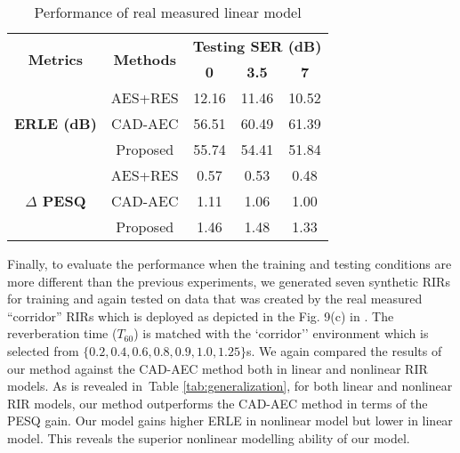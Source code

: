 \documentclass{article}
\begin{document}
\begin{sloppy}
\begin{table}[htb]
\setlength{\abovecaptionskip}{0.2cm}
\setlength{\belowcaptionskip}{0.2cm}
\centering
\caption{Performance of real measured linear model}
\label{tab:reallinear}
\begin{tabular}{|c|c|c|c|c|}
\hline
\multirow{2}{*}{\textbf{Metrics}}   & \multirow{2}{*}{\textbf{Methods}} & \multicolumn{3}{c|}{\textbf{Testing SER (dB)}} \\ \cline{3-5}
                      &       & \textbf{0}     & \textbf{3.5}    & \textbf{7}           \\ \hline \hline
\multirow{3}{*}{\textbf{ERLE (dB)}} & AES+RES    & 12.16    & 11.46    & 10.52       \\ \cline{2-5}
                      & CAD-AEC     & 56.51   & 60.49   & 61.39  \\ \cline{2-5}
                      & Proposed    & 55.74   & 54.41   & 51.84  \\ \hline
\multirow{3}{*}{\textbf{$\Delta$ PESQ}} & AES+RES   & 0.57   & 0.53    & 0.48       \\ \cline{2-5}
                      & CAD-AEC       & 1.11   & 1.06    & 1.00  \\ \cline{2-5}
                      & Proposed      & 1.46  & 1.48   &  1.33     \\ \hline
\end{tabular}
\end{table}
Finally, to evaluate the performance when the training and testing conditions are more different than the previous experiments, we generated seven synthetic RIRs for training and again tested on data that was created by the real measured ``corridor'' RIRs which is deployed as depicted in the Fig. 9(c) in \cite{realRIR}. The reverberation time ($T_{60}$) is matched with the `corridor'' environment which is selected from $\{0.2, 0.4, 0.6, 0.8, 0.9, 1.0, 1.25\}$s. We again compared the results of our method against the CAD-AEC method \cite{Fazel1} both in linear and nonlinear RIR models.
As is revealed in~Table \ref{tab:generalization}, for both linear and nonlinear RIR models, our method outperforms the CAD-AEC method in terms of the PESQ gain. Our model gains higher ERLE in nonlinear model but lower in linear model. This reveals the superior nonlinear modelling ability of our model.


\end{sloppy}
\end{document}
